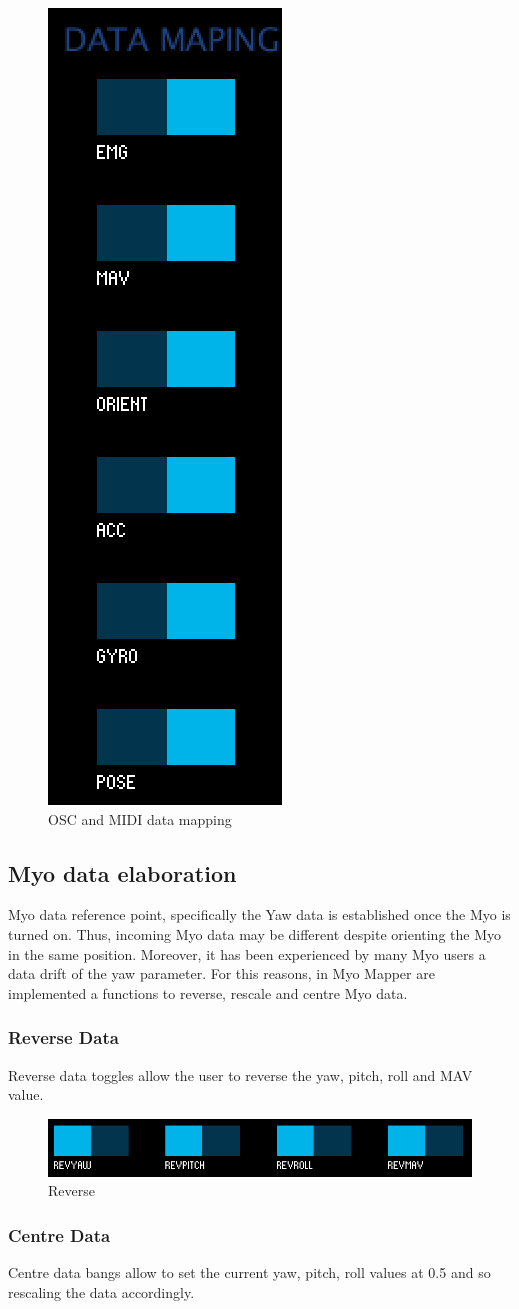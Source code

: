 \documentclass[12pt,a4paper]{article}
\begin{document}
		\begin{figure}[h]
			\centering
			\includegraphics[height=0.6\linewidth]{../MyoMapper-DataMapping}
			\caption{OSC and MIDI data mapping}
			\label{fig:MyoMapper-DataMapping}
		\end{figure}
		
		\subsection{Myo data elaboration}
		Myo data reference point, specifically the Yaw data is established once the Myo is turned on. Thus, incoming Myo data may be different despite orienting the Myo in the same position. Moreover, it has been experienced by many Myo users a data drift of the yaw parameter.
		For this reasons, in Myo Mapper are implemented a functions to reverse, rescale and centre Myo data.
		
		\subsubsection*{Reverse Data} 
		Reverse data toggles allow the user to reverse the yaw, pitch, roll and MAV value.
		
		\begin{figure}[h]
			\centering
			\includegraphics[width=0.6\linewidth]{../MyoMapper-Rev}
			\caption{Reverse}
			\label{fig:MyoMapper-Rev}
		\end{figure}		

		\subsubsection*{Centre Data}
		Centre data bangs allow to set the current yaw, pitch, roll values at 0.5 and so rescaling the data accordingly.
		
\end{document}
